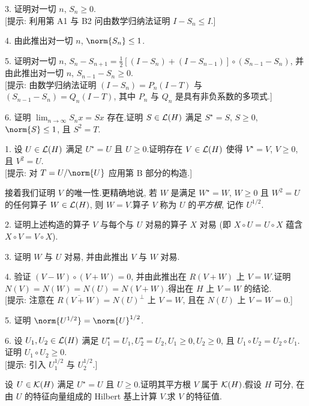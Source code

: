 \begin{problem}[第 5, 6 章]
3. 证明对一切 $n$, $S_n\ge0$.\\
{[提示: 利用第 A1 与 B2 问由数学归纳法证明 $I-S_n\le I$.]}

4. 由此推出对一切 $n$, $\norm{S_n}\le1$.

5. 证明对一切 $n$, $S_n-S_{n+1}=\frac12[(I-S_n)+(I-S_{n-1})]\circ(S_{n-1}-S_n)$,
并由此推出对一切 $n$, $S_{n-1}-S_n\ge0$.\\
{[提示: 由数学归纳法证明 $(I-S_n)=P_n(I-T)$ 与 $(S_{n-1}-S_n)=Q_n(I-T)$, 其中 $P_n$
与 $Q_n$ 是具有非负系数的多项式.]}

6. 证明 $\lim_{n\to\infty}S_nx=Sx$ 存在.证明 $S\in\mathcal{L}(H)$ 满足 $S^\star=S$, $S\ge0$,
$\norm{S}\le1$, 且 $S^2=T$.


1. 设 $U\in\mathcal{L}(H)$ 满足 $U^\star=U$ 且 $U\ge0$.证明存在 $V\in\mathcal{L}(H)$ 使得 $V^\star=V$,
$V\ge0$, 且 $V^2=U$.\\
{[提示: 对 $T=U/\norm{U}$ 应用第 B 部分的构造.]}

接着我们证明 $V$ 的唯一性.更精确地说, 若 $W$ 是满足 $W^\star=W$, $W\ge0$ 且 $W^2=U$
的任何算子 $W\in\mathcal{L}(H)$, 则 $W=V$.算子 $V$ 称为 $U$ 的\emph{平方根}, 记作 $U^{1/2}$.

2. 证明上述构造的算子 $V$ 与每个与 $U$ 对易的算子 $X$ 对易 (即 $X\circ U=U\circ X$
蕴含 $X\circ V=V\circ X$).

3. 证明 $W$ 与 $U$ 对易, 并由此推出 $V$ 与 $W$ 对易.

4. 验证 $(V-W)\circ(V+W)=0$, 并由此推出在 $R(V+W)$ 上 $V=W$.证明
$N(V)=N(W)=N(U)=N(V+W)$.得出在 $H$ 上 $V=W$ 的结论.\\
{[提示: 注意在 $\overline{R(V+W)}=N(U)^\perp$ 上 $V=W$, 且在 $N(U)$ 上 $V=W=0$.]}

5. 证明 $\norm{U^{1/2}}=\norm{U}^{1/2}$.

6. 设 $U_1,U_2\in\mathcal{L}(H)$ 满足 $U_1^\star=U_1,U_2^\star=U_2,U_1\ge0,U_2\ge0$, 且
$U_1\circ U_2=U_2\circ U_1$.证明 $U_1\circ U_2\ge0$.\\
{[提示: 引入 $U_1^{1/2}$ 与 $U_2^{1/2}$.]}


设 $U\in\mathcal{K}(H)$ 满足 $U^\star=U$ 且 $U\ge0$.证明其平方根 $V$ 属于 $\mathcal{K}(H)$.假设
$H$ 可分, 在由 $U$ 的特征向量组成的 Hilbert 基上计算 $V$.求 $V$ 的特征值.
\end{problem}

